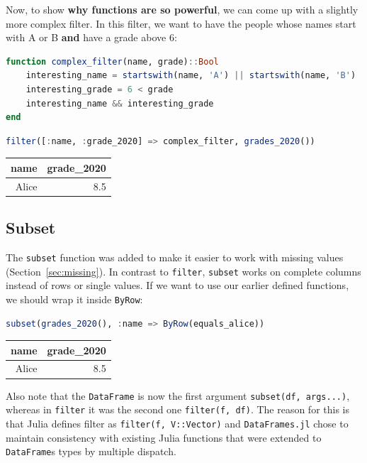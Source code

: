 \documentclass[
  notoc %
]{tufte-book}
\newcommand{\passthrough}[1]{#1}
\begin{document}
Now, to show \textbf{why functions are so powerful}, we can come up with
a slightly more complex filter. In this filter, we want to have the
people whose names start with A or B \textbf{and} have a grade above 6:

\begin{lstlisting}[language=Julia]
function complex_filter(name, grade)::Bool
    interesting_name = startswith(name, 'A') || startswith(name, 'B')
    interesting_grade = 6 < grade
    interesting_name && interesting_grade
end
\end{lstlisting}

\begin{lstlisting}[language=Julia]
filter([:name, :grade_2020] => complex_filter, grades_2020())
\end{lstlisting}

\begin{longtable}[]{@{}rr@{}}
\toprule
name & grade\_2020 \\
\midrule
\endhead
Alice & 8.5 \\
\bottomrule
\end{longtable}

\hypertarget{sec:subset}{%
\subsection{Subset}\label{sec:subset}}

The \passthrough{\lstinline!subset!} function was added to make it
easier to work with missing values (Section~\ref{sec:missing}). In
contrast to \passthrough{\lstinline!filter!},
\passthrough{\lstinline!subset!} works on complete columns instead of
rows or single values. If we want to use our earlier defined functions,
we should wrap it inside \passthrough{\lstinline!ByRow!}:

\begin{lstlisting}[language=Julia]
subset(grades_2020(), :name => ByRow(equals_alice))
\end{lstlisting}

\begin{longtable}[]{@{}rr@{}}
\toprule
name & grade\_2020 \\
\midrule
\endhead
Alice & 8.5 \\
\bottomrule
\end{longtable}

Also note that the \passthrough{\lstinline!DataFrame!} is now the first
argument \passthrough{\lstinline!subset(df, args...)!}, whereas in
\passthrough{\lstinline!filter!} it was the second one
\passthrough{\lstinline!filter(f, df)!}. The reason for this is that
Julia defines filter as \passthrough{\lstinline!filter(f, V::Vector)!}
and \passthrough{\lstinline!DataFrames.jl!} chose to maintain
consistency with existing Julia functions that were extended to
\passthrough{\lstinline!DataFrame!}s types by multiple dispatch.
\end{document}
